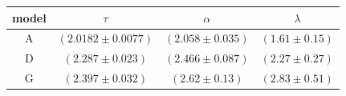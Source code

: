\begin{tabular}{cccc}
\toprule
model & $\tau$ & $\alpha$ & $\lambda$ \\
\midrule
A & $ (2.0182\pm0.0077) $ & $ (2.058\pm0.035) $ & $ (1.61\pm0.15) $ \\
D & $ (2.287\pm0.023) $ & $ (2.466\pm0.087) $ & $ (2.27\pm0.27) $ \\
G & $ (2.397\pm0.032) $ & $ (2.62\pm0.13) $ & $ (2.83\pm0.51) $ \\
\bottomrule
\end{tabular}
